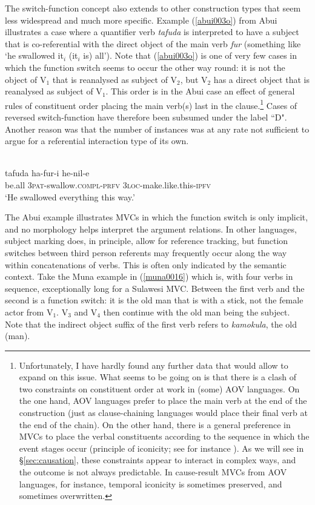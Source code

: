 The switch-function concept also extends to other construction types that seem less widespread and much more specific. Example (\ref{abui003o}) from Abui illustrates a case where a quantifier verb \textit{tafuda} is interpreted to have a subject that is co-referential with the direct object of the main verb \textit{fur} (something like `he swallowed it$_i$ (it$_i$ is) all'). Note that (\ref{abui003o}) is one of very few cases in which the function switch seems to occur the other way round: it is not the object of V$_1$ that is reanalysed as subject of V$_2$, but V$_2$ has a direct object that is reanalysed as subject of V$_1$. This order is in the Abui case an effect of general rules of constituent order placing the main verb(s) last in the clause.\footnote{Unfortunately, I have hardly found any further data that would allow to expand on this issue. What seems to be going on is that there is a clash of two constraints on constituent order at work in (some) AOV languages. On the one hand, AOV languages prefer to place the main verb at the end of the construction (just as clause-chaining languages would place their final verb at the end of the chain). On the other hand, there is a general preference in MVCs to place the verbal constituents according to the sequence in which the event stages occur (principle of iconicity; see for instance \citealt{vanstaden2008serial}). As we will see in §\ref{sec:causation}, these constraints appear to interact in complex ways, and the outcome is not always predictable. In cause-result MVCs from AOV languages, for instance, temporal iconicity is sometimes preserved, and sometimes overwritten.} Cases of reversed switch-function have therefore been subsumed under the label ``D". Another reason was that the number of instances was at any rate not sufficient to argue for a referential interaction type of its own.

\ea \label{abui003o}
\\
\gll tafuda ha-fur-i he-nil-e \\
be.all 3\textsc{pat}-swallow.\textsc{compl}-\textsc{prfv} 3\textsc{loc}-make.like.this-\textsc{ipfv} \\
\glft `He swallowed everything this way.’\\ 
\z

The Abui example illustrates MVCs in which the function switch is only implicit, and no morphology helps interpret the argument relations. In other languages, subject marking does, in principle, allow for reference tracking, but function switches between third person referents may frequently occur along the way within concatenations of verbs. This is often only indicated by the semantic context. Take the Muna example in (\ref{muna0016}) which is, with four verbs in sequence, exceptionally long for a Sulawesi MVC. Between the first verb and the second is a function switch: it is the old man that is with a stick, not the female actor from V$_1$. V$_3$ and V$_4$ then continue with the old man being the subject. Note that the indirect object suffix of the first verb refers to \textit{kamokula}, the old (man).

